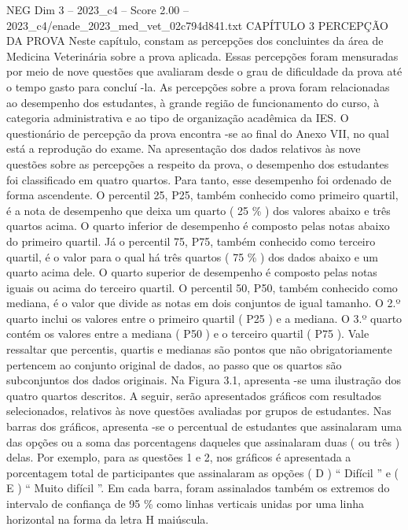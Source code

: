 \begin{textsample}{NEG Dim 3 – 2023\_c4 – Score 2.00 – 2023\_c4/enade\_2023\_med\_vet\_02c794d841.txt}  \label{ex:f3_neg_209}
CAPÍTULO 3 PERCEPÇÃO DA PROVA Neste capítulo, constam as percepções dos concluintes da área de Medicina Veterinária sobre a prova aplicada.
Essas percepções foram mensuradas por meio de nove questões que avaliaram desde o grau de dificuldade da prova até o tempo gasto para concluí -la.
As percepções sobre a prova foram relacionadas ao desempenho dos estudantes, à grande região de funcionamento do curso, à categoria administrativa e ao tipo de organização acadêmica da IES.
O questionário de percepção da prova encontra -se ao final do Anexo VII, no qual está a reprodução do exame.
Na apresentação dos dados relativos às nove questões sobre as percepções a respeito da prova, o desempenho dos estudantes foi classificado em quatro quartos.
Para tanto, esse desempenho foi ordenado de forma ascendente.
O percentil 25, P25, também conhecido como primeiro quartil, é a nota de desempenho que deixa um quarto ( 25 \% ) dos valores abaixo e três quartos acima.
O quarto inferior de desempenho é composto pelas notas abaixo do primeiro quartil.
Já o percentil 75, P75, também conhecido como terceiro quartil, é o valor para o qual há três quartos ( 75 \% ) dos dados abaixo e um quarto acima dele.
O quarto superior de desempenho é composto pelas notas iguais ou acima do terceiro quartil.
O percentil 50, P50, também conhecido como mediana, é o valor que divide as notas em dois conjuntos de igual tamanho.
O 2.º quarto inclui os valores entre o primeiro quartil ( P25 ) e a mediana.
O 3.º quarto contém os valores entre a mediana ( P50 ) e o terceiro quartil ( P75 ).
Vale ressaltar que percentis, quartis e medianas são pontos que não obrigatoriamente pertencem ao conjunto original de dados, ao passo que os quartos são subconjuntos dos dados originais.
Na Figura 3.1, apresenta -se uma ilustração dos quatro quartos descritos.
A seguir, serão apresentados gráficos com resultados selecionados, relativos às nove questões avaliadas por grupos de estudantes.
Nas barras dos gráficos, apresenta -se o percentual de estudantes que assinalaram uma das opções ou a soma das porcentagens daqueles que assinalaram duas ( ou três ) delas.
Por exemplo, para as questões 1 e 2, nos gráficos é apresentada a porcentagem total de participantes que assinalaram as opções ( D ) “ Difícil ” e ( E ) “ Muito difícil ”.
Em cada barra, foram assinalados também os extremos do intervalo de confiança de 95 \% como linhas verticais unidas por uma linha horizontal na forma da letra H maiúscula.

\end{textsample}
